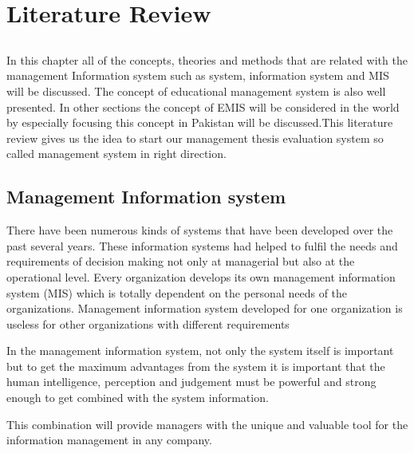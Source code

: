 \chapter{Literature Review} \label{chap:literatureReview}


\section*{}
In this chapter all of the concepts, theories and methods that are related with the management Information system such as system, information system and MIS will be discussed. The concept of educational management system is also well presented. In other sections the concept of EMIS will be considered in the world by especially focusing this concept in Pakistan will be discussed.This literature review gives us the idea to start our management thesis evaluation system so called management system in right direction.


\section{Management Information system}

There have been numerous kinds of systems that have been developed over the past several years. These information systems had helped to fulfil the needs and requirements of decision making not only at managerial but also at the operational level. Every organization develops its own management information system (MIS) which is totally dependent on the personal needs of the organizations. Management information system developed for one organization is useless for other organizations with different requirements 
\par In the management information system, not only the system itself is important but to get the maximum advantages from the system it is important that the human intelligence, perception and judgement must be powerful and strong enough to get combined with the system information.\par This combination will provide managers with the unique and valuable tool for the information management in any company.

